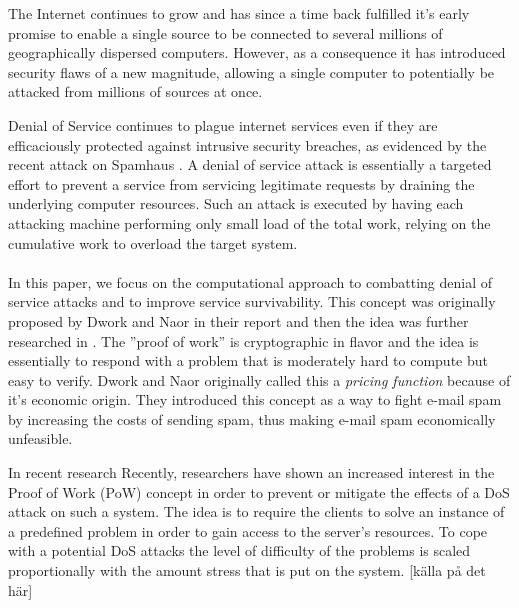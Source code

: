 The Internet continues to grow and has since a time back fulfilled it's early promise to enable a single source to be connected to several millions of geographically dispersed computers. However, as a consequence it has introduced security flaws of a new magnitude, allowing a single computer to potentially be attacked from millions of sources at once.

Denial of Service continues to plague internet services even if they are efficaciously protected against intrusive security breaches, as evidenced by the recent attack on Spamhaus \cite{BBC}. A denial of service attack is essentially a targeted effort to prevent a service from servicing legitimate requests by draining the underlying computer resources. Such an attack is executed by having each attacking machine performing only small load of the total work, relying on the cumulative work to overload the target system. 
\\
\\
In this paper, we focus on the computational approach to combatting denial of service attacks and to improve service survivability. This concept was originally proposed by Dwork and Naor in their report  and then the idea was further researched in . The ''proof of work'' is cryptographic in flavor and the idea is essentially to respond with a problem that is moderately hard to compute but easy to verify. Dwork and Naor originally called this a \emph{pricing function} because of it's economic origin. They introduced this concept as a way to fight e-mail spam by increasing the costs of sending spam, thus making e-mail spam economically unfeasible.

In recent research Recently, researchers have shown an increased interest in the Proof of Work (PoW) concept in order to prevent or mitigate the effects of a DoS attack on such a system. The idea is to require the clients to solve an instance of a predefined problem in order to gain access to the server’s resources. To cope with a potential DoS attacks the level of difficulty of the problems is scaled proportionally with the amount stress that is put on the system. [källa på det här]


